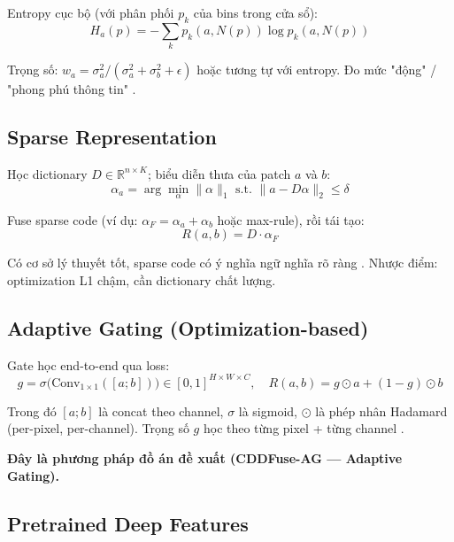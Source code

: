 \documentclass[12pt,a4paper]{article}
\begin{document}
Entropy cục bộ (với phân phối $p_k$ của bins trong cửa sổ):
\begin{equation}
H_a(p) = -\sum_{k} p_k(a, N(p)) \log p_k(a, N(p))
\end{equation}

Trọng số: $w_a = \sigma^2_a / (\sigma^2_a + \sigma^2_b + \epsilon)$ hoặc tương tự với entropy. Đo mức "động" / "phong phú thông tin" \cite{liu2017survey}.

\subsection{Sparse Representation}

Học dictionary $D \in \mathbb{R}^{n \times K}$; biểu diễn thưa của patch $a$ và $b$:
\begin{equation}
\alpha_a = \arg\min_{\alpha} \|\alpha\|_1 \text{ s.t. } \|a - D\alpha\|_2 \le \delta
\end{equation}

Fuse sparse code (ví dụ: $\alpha_F = \alpha_a + \alpha_b$ hoặc max-rule), rồi tái tạo:
\begin{equation}
R(a, b) = D \cdot \alpha_F
\end{equation}

Có cơ sở lý thuyết tốt, sparse code có ý nghĩa ngữ nghĩa rõ ràng \cite{yang2010spfusion}. Nhược điểm: optimization L1 chậm, cần dictionary chất lượng.

\subsection{Adaptive Gating (Optimization-based)}

Gate học end-to-end qua loss:
\begin{equation}
g = \sigma\big(\mathrm{Conv}_{1\times 1}([a; b])\big) \in [0, 1]^{H \times W \times C}, \quad
R(a, b) = g \odot a + (1 - g) \odot b
\end{equation}

Trong đó $[a; b]$ là concat theo channel, $\sigma$ là sigmoid, $\odot$ là phép nhân Hadamard (per-pixel, per-channel). Trọng số $g$ học theo từng pixel + từng channel \cite{prabhakar2017deepfuse, ma2019fusiongan}.

\textbf{Đây là phương pháp đồ án đề xuất (CDDFuse-AG --- Adaptive Gating).}

\subsection{Pretrained Deep Features}
\end{document}
